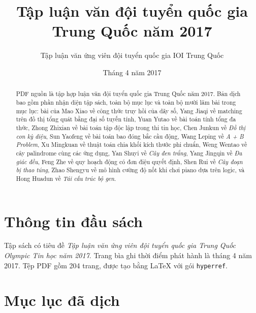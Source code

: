 \documentclass[11pt]{article}
\title{Tập luận văn đội tuyển quốc gia Trung Quốc năm 2017}
\author{Tập luận văn ứng viên đội tuyển quốc gia IOI Trung Quốc}
\date{Tháng 4 năm 2017}
\begin{document}
\maketitle


\renewcommand{\abstractname}{Tóm tắt}
\begin{abstract}
PDF nguồn là tập hợp luận văn đội tuyển quốc gia Trung Quốc năm 2017. Bản dịch
bao gồm phần nhận diện tập sách, toàn bộ mục lục và toàn bộ mười lăm bài trong
mục lục: bài của Mao Xiao về công thức
truy hồi của dãy số, Yang Jiaqi về matching trên đồ thị tổng quát bằng đại số
tuyến tính, Yuan Yutao về bài toán tính tổng đa thức, Zhong Zhixian về bài
toán tập độc lập trong thi tin học, Chen Junkun về \emph{Đồ thị con kỳ diệu},
Sun Yaofeng về bài toán bao đóng bắc cầu động, Wang Leping về
\emph{A + B Problem}, Xu Mingkuan về thuật toán chia khối kích thước phi chuẩn,
Weng Wentao về cây palindrome cùng các ứng dụng, Yan Shuyi về
\emph{Cây đen trắng}, Yang Jingqin về \emph{Đa giác đều}, Feng Zhe về quy
hoạch động có đơn điệu quyết định, Shen Rui về \emph{Cây đoạn bị thao túng},
Zhao Shengyu về mô hình cường độ nốt khi chơi piano dựa trên logic, và Hong
Huadun về \emph{Tái cấu trúc bộ gen}.
\end{abstract}

\section{Thông tin đầu sách}

Tập sách có tiêu đề \emph{Tập luận văn ứng viên đội tuyển quốc gia Trung Quốc
Olympic Tin học năm 2017}. Trang bìa ghi thời điểm phát hành là tháng 4 năm
2017. Tệp PDF gồm 204 trang, được tạo bằng LaTeX với gói \texttt{hyperref}.

\section{Mục lục đã dịch}
\end{document}
